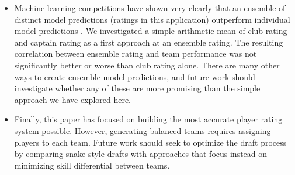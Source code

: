 \begin{itemize}
\item Machine learning competitions have shown very clearly that an ensemble of distinct model predictions (ratings in this application) outperform individual model predictions \cite{mlwave}. We investigated a simple arithmetic mean of club rating and captain rating as a first approach at an ensemble rating. The resulting correlation between ensemble rating and team performance was not significantly better or worse than club rating alone. There are many other ways to create ensemble model predictions, and future work should investigate whether any of these are more promising than the simple approach we have explored here.

\item Finally, this paper has focused on building the most accurate player rating system possible. However, generating balanced teams requires assigning players to each team. Future work should seek to optimize the draft process by comparing snake-style drafts with approaches that focus instead on minimizing skill differential between teams. 

\end{itemize}